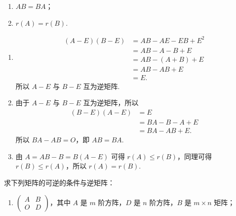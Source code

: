 \begin{exercise}
\begin{exgroup}
\begin{enumerate}
            \item $AB=BA$；

            \item $r(A)=r(B)$.
        \end{enumerate}
        \begin{answer}
            \begin{enumerate}
                \item \begin{align*}
                          (A - E)(B - E) & = AB - AE - EB + E^2 \\
                                         & = AB - A - B + E     \\
                                         & = AB - (A + B) + E   \\
                                         & = AB - AB + E        \\
                                         & = E.
                      \end{align*}
                      所以 $ A - E $ 与 $ B - E $ 互为逆矩阵.

                \item 由于 $ A - E $ 与 $ B - E $ 互为逆矩阵，所以
                      \begin{align*}
                          (B - E)(A - E) & = E              \\
                                         & = BA - B - A + E \\
                                         & = BA - AB + E.
                      \end{align*}
                      所以 $ BA - AB = O $，即 $ AB = BA $.

                \item 由 $ A = AB - B = B(A - E) $ 可得 $ r(A) \leqslant r(B) $，同理可得 $ r(B) \leqslant r(A) $，所以 $ r(A) = r(B) $.
            \end{enumerate}
        \end{answer}

        \item 求下列矩阵的可逆的条件与逆矩阵：
            \begin{enumerate}
                \item $\begin{pmatrix}
                        A & B \\ O & D
                    \end{pmatrix}$，其中 $A$ 是 $m$ 阶方阵，$D$ 是 $n$ 阶方阵，$B$ 是 $m \times n$ 矩阵；


\end{enumerate}
\end{exgroup}
\end{exercise}
